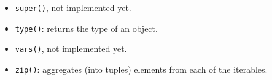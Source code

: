 \begin{itemize}
\item
\texttt{super()},
\dotfill not implemented yet.

\item \texttt{type()}: returns the type of an object.

\item
\texttt{vars()},
\dotfill not implemented yet.

\item \texttt{zip()}: aggregates (into tuples) elements from each of the iterables.
\end{itemize}

%